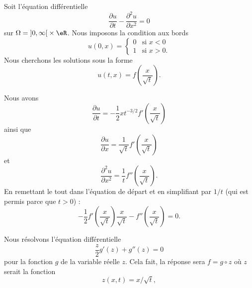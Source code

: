 Soit l'équation différentielle
\begin{equation}        \label{EQooPGDPooTjiVhB}
	\frac{ \partial u }{ \partial t }-\frac{ \partial^2u }{ \partial x^2 }=0
\end{equation}
sur \( \Omega=\mathopen] 0 , \infty \mathclose[\times \eR\). Nous imposons la condition aux bords
\begin{equation}        \label{EQooJHPVooMkvODe}
	u(0,x)=\begin{cases}
		0 & \text{si } x<0  \\
		1 & \text{si } x>0.
	\end{cases}
\end{equation}
Nous cherchons les solutions sous la forme
\begin{equation}
	u(t,x)=f\left( \frac{ x }{ \sqrt{ t } } \right).
\end{equation}

Nous avons
\begin{equation}
	\frac{ \partial u }{ \partial t }=-\frac{ 1 }{2}xt^{-3/2}f'\left( \frac{ x }{ \sqrt{ t } } \right)
\end{equation}
ainsi que
\begin{equation}
	\frac{ \partial u }{ \partial x }=\frac{1}{ \sqrt{ t } }f'\left( \frac{ x }{ \sqrt{ t } } \right)
\end{equation}
et
\begin{equation}
	\frac{ \partial^2u }{ \partial x^2 }=\frac{1}{ t }f''\left( \frac{ x }{ \sqrt{ t } } \right).
\end{equation}
En remettant le tout dans l'équation de départ et en simplifiant par \( 1/t\) (qui est permis parce que \( t>0\)) :
\begin{equation}        \label{EQooCRKIooYNhvaA}
	-\frac{ 1 }{2}f'\left( \frac{ x }{ \sqrt{ t } } \right)\frac{ x }{ \sqrt{ t } }-f''\left( \frac{ x }{ \sqrt{ t } } \right)=0.
\end{equation}

Nous résolvons l'équation différentielle
\begin{equation}        \label{EQooEFQPooGWVoUq}
	\frac{ z }{ 2 }g'(z)+g''(z)=0
\end{equation}
pour la fonction \( g\) de la variable réelle \( z\). Cela fait, la réponse sera \( f=g\circ z\) où \( z\) serait la fonction
\begin{equation}
	z(x,t)=x/\sqrt{ t },
\end{equation}

